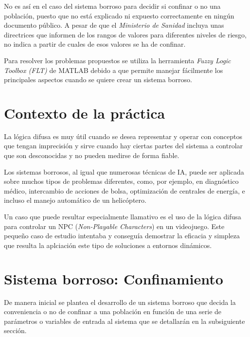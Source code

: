 \documentclass[12pt,a4paper, xcolor=table]{article}
\begin{document}
\vspace{2mm}

No es así en el caso del sistema borroso para decidir si confinar o no una población, puesto que no está explicado ni expuesto correctamente en ningún documento público. A pesar de que el \textit{Ministerio de Sanidad}\cite{paciente} incluya unas directrices que informen de los rangos de valores para diferentes niveles de riesgo, no indica a partir de cuales de esos valores se ha de confinar.

\vspace{4mm}

Para resolver los problemas propuestos se utiliza la herramienta \textit{Fuzzy Logic Toolbox (FLT)} de MATLAB debido a que permite manejar fácilmente los principales aspectos cuando se quiere crear un sistema borroso.

\newpage

\section{Contexto de la práctica}

La lógica difusa es muy útil cuando se desea representar y operar con conceptos que tengan imprecisión y sirve cuando hay ciertas partes del sistema a controlar que son desconocidas y no pueden medirse de forma fiable.

\vspace{3mm}

Los sistemas borrosos, al igual que numerosas técnicas de IA, puede ser aplicada sobre muchos tipos de problemas diferentes, como, por ejemplo, en diagnóstico médico, intercambio de acciones de bolsa, optimización de centrales de energía, e incluso el manejo automático de un helicóptero\cite{fuzzy}.

\vspace{2mm}

Un caso que puede resultar especialmente llamativo es el uso de la lógica difusa para controlar un NPC (\textit{Non-Playable Characters}) en un videojuego\cite{fuzzygame}. Este pequeño caso de estudio intentaba y conseguía demostrar la eficacia y simpleza que resulta la aplciación este tipo de soluciones a entornos dinámicos.

\vspace{2mm}




\section{Sistema borroso: Confinamiento}
De manera inicial se plantea el desarrollo de un sistema borroso que decida la conveniencia o no de confinar a una población en función de una serie de parámetros o variables de entrada al sistema que se detallarán en la subsiguiente sección.
\end{document}
